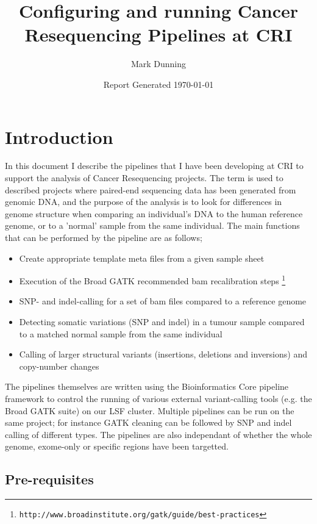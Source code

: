 \documentclass[a4paper,11pt]{article}
\title{Configuring and running Cancer Resequencing Pipelines at CRI}
\date{Report Generated \today}
\author{Mark Dunning}
\begin{document}
\maketitle

\section{Introduction}

In this document I describe the pipelines that I have been developing at CRI to support the analysis of Cancer Resequencing projects. The term is used to described projects where paired-end sequencing data has been generated from genomic DNA, and the purpose of the analysis is to look for differences in genome structure when comparing an individual's DNA to the human reference genome, or to a 'normal' sample from the same individual. The main functions that can be performed by the pipeline are as follows;

\begin{itemize}
\item Create appropriate template meta files from a given sample sheet
 \item Execution of the Broad GATK recommended bam recalibration steps {\footnote {\tt http://www.broadinstitute.org/gatk/guide/best-practices}}
 \item SNP- and indel-calling for a set of bam files compared to a reference genome
 \item Detecting somatic variations (SNP and indel) in a tumour sample compared to a matched normal sample from the same individual
 \item Calling of larger structural variants (insertions, deletions and inversions) and copy-number changes

\end{itemize}

The pipelines themselves are written using the Bioinformatics Core pipeline framework to control the running of various external variant-calling tools (e.g. the Broad GATK suite) on our LSF cluster. Multiple pipelines can be run on the same project; for instance GATK cleaning can be followed by SNP and indel calling of different types. The pipelines are also independant of whether the whole genome, exome-only or specific regions have been targetted.

\subsection{Pre-requisites}
\end{document}
